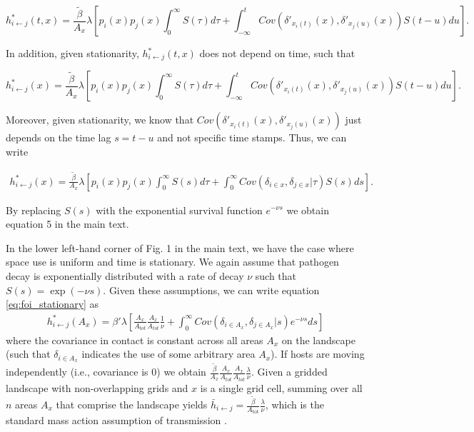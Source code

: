 \documentclass[11pt]{article}
\begin{document}
$$
h^*_{i \leftarrow j}(t, x) = \frac{\tilde{\beta}}{A_x} \lambda \left[p_i(x) p_j(x) \int_0^\infty S(\tau) d\tau  + \int_{-\infty}^t Cov(\delta'_{x_i(t)}(x), \delta'_{x_j(u)}(x)) S(t - u) du\right].
$$

In addition, given stationarity, $h^*_{i \leftarrow j}(t, x)$ does not depend on time, such that 

$$
h^*_{i \leftarrow j}(x) = \frac{\tilde{\beta}}{A_x} \lambda \left[p_i(x) p_j(x) \int_0^\infty S(\tau) d\tau  + \int_{-\infty}^t Cov(\delta'_{x_i(t)}(x), \delta'_{x_j(u)}(x)) S(t - u) du\right].
$$

Moreover, given stationarity, we know that $Cov(\delta'_{x_i(t)}(x), \delta'_{x_j(u)}(x))$ just depends on the time lag $s = t - u$ and not specific time stamps. Thus, we can write

\begin{equation}
    \begin{aligned}
   h^*_{i \leftarrow j}(x) = \frac{\tilde{\beta}}{A_x} \lambda \left[p_i(x)p_j(x) \int_0^\infty S(s) d\tau + \int_{0}^{\infty} Cov(\delta_{i \in x}, \delta_{j \in x} | \tau) S(s) ds\right].
    \end{aligned}
    \label{eq:foi_stationary}
\end{equation}

By replacing $S(s)$ with the exponential survival function $e^{-\nu s}$ we obtain equation 5 in the main text.

In the lower left-hand corner of Fig. 1 in the main text, we have the case where space use is uniform and time is stationary. We again assume that pathogen decay is exponentially distributed with a rate of decay $\nu$ such that $S(s) = \exp(-\nu s)$. Given these assumptions, we can write equation \ref{eq:foi_stationary} as
\begin{equation}
    \begin{aligned}
        h^*_{i \leftarrow j}(A_x) = \beta' \lambda \left[\frac{A_x}{A_{tot}}\frac{A_x}{A_{tot}} \frac{1}{\nu} +  \int_{0}^{\infty} Cov(\delta_{i \in A_x}, \delta_{j \in A_x} | s) e^{-\nu s} ds\right]
    \end{aligned}
    \label{eq:uniform_stationary1}
\end{equation}
where the covariance in contact is constant across all areas $A_x$ on the landscape (such that $\delta_{i \in A_x}$ indicates the use of some arbitrary area $A_x$).  
If hosts are moving independently (i.e., covariance is 0) we obtain $\frac{\tilde{\beta}}{A_x} \frac{A_x}{A_{tot}} \frac{A_x}{A_{tot}}  \frac{\lambda}{\nu}$. Given a gridded landscape with non-overlapping grids and $x$ is a single grid cell, summing over all $n$ areas $A_x$ that comprise the landscape yields $\bar{h}_{i \leftarrow j} =\frac{\tilde{\beta}}{A_\text{tot}} \frac{\lambda}{\nu}$, which is the standard mass action assumption of transmission \citep{McCallum2001}. 
\end{document}
